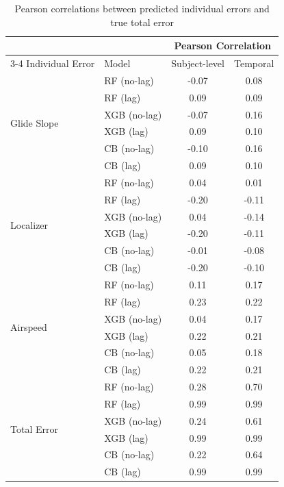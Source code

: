 \documentclass[11pt, a4paper]{article}
\begin{document}
\begin{table}[htbp]
	\caption{Pearson correlations between predicted individual errors and true total error}
	\label{tab:corr-pred-total}
	\centering
	\small
	\begin{tabular}{llcc}
		\toprule
		                      &        & \multicolumn{2}{c}{Pearson Correlation} \\
		                      			\cmidrule{3-4}  	
		Individual Error      & Model  & Subject-level & Temporal  \\ 
		\midrule
		\multirow{6}{*}{Glide Slope}  	& RF (no-lag) 	& -0.07	 & 0.08\\
										& RF (lag) 		&  0.09	 & 0.09\\
										& XGB (no-lag) 	& -0.07   & 0.16 \\
										& XGB (lag) 	&  0.09 & 0.10\\
										& CB (no-lag) 	&  -0.10 & 0.16\\
										& CB (lag) 		&  0.09 & 0.10\\
		\midrule
		\multirow{6}{*}{Localizer}      & RF (no-lag) 	&  0.04 & 0.01\\
										& RF (lag) 		& -0.20 & -0.11\\
										& XGB (no-lag) 	&  0.04 & -0.14\\
										& XGB (lag) 	& -0.20 & -0.11\\
										& CB (no-lag) 	& -0.01 & -0.08\\
										& CB (lag) 		&  -0.20 & -0.10\\
		\midrule
		\multirow{6}{*}{Airspeed}  	& RF (no-lag) 	&  0.11 & 0.17\\
									& RF (lag) 		&  0.23 & 0.22\\
									& XGB (no-lag) 	&  0.04 & 0.17\\
									& XGB (lag) 	&  0.22 & 0.21\\
									& CB (no-lag) 	&  0.05 & 0.18\\
									& CB (lag) 		&  0.22 & 0.21\\
		\midrule
		\multirow{6}{*}{Total Error}	& RF (no-lag) 	&  0.28 & 0.70\\
										& RF (lag) 		&  0.99 & 0.99\\
										& XGB (no-lag) 	&  0.24 & 0.61\\
										& XGB (lag) 	&  0.99 & 0.99\\
										& CB (no-lag) 	&  0.22 & 0.64\\
										& CB (lag) 		&  0.99 & 0.99\\
		\bottomrule
	\end{tabular}
\end{table}
\end{document}
